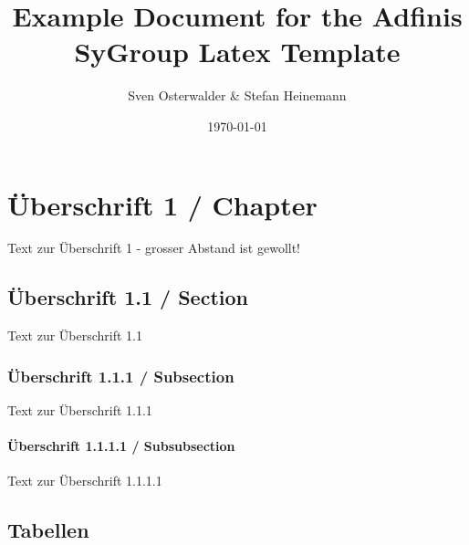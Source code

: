 \documentclass[oneside]{report}
\title{Example Document for the Adfinis SyGroup Latex Template}
\author{Sven Osterwalder \& Stefan Heinemann}
\date{\today}
\begin{document}
\maketitle{}
%

\tableofcontents{}

\chapter{Überschrift 1 / Chapter}

Text zur Überschrift 1 - grosser Abstand ist gewollt!

\section{Überschrift 1.1 / Section}

Text zur Überschrift 1.1

\subsection{Überschrift 1.1.1 / Subsection}

Text zur Überschrift 1.1.1

\subsubsection{Überschrift 1.1.1.1 / Subsubsection}

Text zur Überschrift 1.1.1.1


\section{Tabellen}
\end{document}
